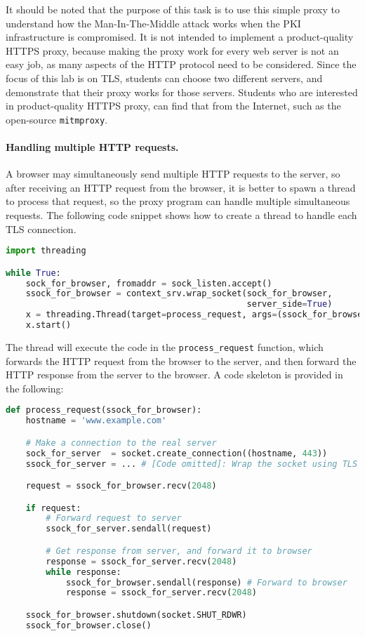 It should be noted that the purpose of this task is to use 
this simple proxy to understand 
how the Man-In-The-Middle attack works when the 
PKI infrastructure is compromised. It is not intended 
to implement a product-quality HTTPS proxy, because
making the proxy work for every web server is not an 
easy job, as many aspects of the HTTP protocol need to be 
considered. Since the focus of this lab is on TLS, 
students can choose two different servers, 
and demonstrate that their proxy works for those servers. 
Students who are interested in product-quality HTTPS proxy,
can find that from the Internet, such as the open-source
\texttt{mitmproxy}.  


\paragraph{Handling multiple HTTP requests.}
A browser may simultaneously send multiple HTTP requests to the server,
so after receiving an HTTP request from the browser, it is better to spawn a thread
to process that request, so the proxy program can handle multiple simultaneous
requests. The following code snippet shows how to create a thread to handle 
each TLS connection.

\begin{lstlisting}[language=Python]
import threading

while True:
    sock_for_browser, fromaddr = sock_listen.accept()
    ssock_for_browser = context_srv.wrap_socket(sock_for_browser, 
                                                server_side=True)
    x = threading.Thread(target=process_request, args=(ssock_for_browser,))
    x.start()
\end{lstlisting}


The thread will execute the code in the \texttt{process\_request} function,
which forwards the HTTP request from the browser to the server, and 
then forward the HTTP response from the server to the browser. A code skeleton
is provided in the following:


\begin{lstlisting}[language=Python]
def process_request(ssock_for_browser):
    hostname = 'www.example.com'

    # Make a connection to the real server
    sock_for_server  = socket.create_connection((hostname, 443))
    ssock_for_server = ... # [Code omitted]: Wrap the socket using TLS

    request = ssock_for_browser.recv(2048)

    if request:
        # Forward request to server
        ssock_for_server.sendall(request)      

        # Get response from server, and forward it to browser
        response = ssock_for_server.recv(2048)
        while response:
            ssock_for_browser.sendall(response) # Forward to browser
            response = ssock_for_server.recv(2048)

    ssock_for_browser.shutdown(socket.SHUT_RDWR)
    ssock_for_browser.close()
\end{lstlisting}


